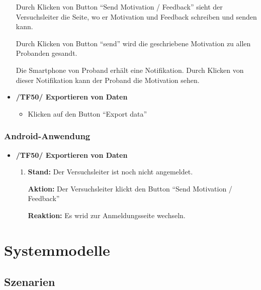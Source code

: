 \documentclass[a4paper]{scrreprt}
\begin{document}
\begin{itemize}
                    \par Durch Klicken von Button ``Send Motivation / Feedback'' sieht der Versuchsleiter die Seite, wo er Motivation und Feedback schreiben und senden kann.
                    \par Durch Klicken von Button ``send'' wird die geschriebene Motivation zu allen Probanden gesandt.
                    \par Die Smartphone von Proband erh\"alt eine Notifikation. Durch Klicken von dieser Notifikation kann der Proband die Motivation sehen.

                \item \textbf{/TF50/ Exportieren von Daten}
                \begin{itemize}
                	\item Klicken auf den Button ``Export data''
                \end{itemize}


            \end{itemize}


        \vspace*{2cm}
        \subsection{Android-Anwendung}

			\begin{itemize}

            \item \textbf{/TF50/ Exportieren von Daten}
            \begin{enumerate}
            	\item \par \textbf{Stand: } Der Versuchsleiter ist noch nicht angemeldet.
            	\par \textbf{Aktion: } Der Versuchsleiter klickt den Button ``Send Motivation / Feedback''
            	\par \textbf{Reaktion: } Es wrid zur Anmeldungsseite wechseln.
            \end{enumerate}
        
		    \end{itemize}

    \chapter{Systemmodelle}

        \section{Szenarien}
\end{document}
